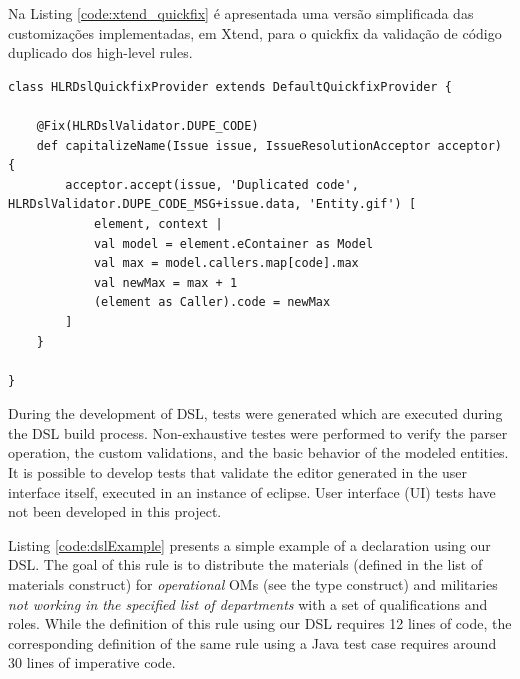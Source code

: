 Na Listing \ref{code:xtend_quickfix} é apresentada uma versão simplificada das customizações implementadas, em Xtend, para o quickfix da validação de código duplicado dos high-level rules.


\begin{small}
\begin{lstlisting}[frame=single, language=Xtend, caption={\it Quickfix Customization}, label={code:xtend_quickfix}]
class HLRDslQuickfixProvider extends DefaultQuickfixProvider {

	@Fix(HLRDslValidator.DUPE_CODE)
	def capitalizeName(Issue issue, IssueResolutionAcceptor acceptor) {
		acceptor.accept(issue, 'Duplicated code', HLRDslValidator.DUPE_CODE_MSG+issue.data, 'Entity.gif') [
			element, context |
			val model = element.eContainer as Model
			val max = model.callers.map[code].max
			val newMax = max + 1			
			(element as Caller).code = newMax
		]
	}
	
}
\end{lstlisting}
\end{small}



During the development of DSL, tests were generated which are executed during the DSL build process. Non-exhaustive testes were performed to verify the parser operation, the custom validations, and the basic behavior of the modeled entities. It is possible to develop tests that validate the editor generated in the user interface itself, executed in an instance of eclipse. User interface (UI) tests have not been developed in this project.



Listing \ref{code:dslExample} presents a simple example of a \shc declaration using our DSL. The goal of this rule is to distribute the materials (defined in the list of materials construct) for \emph{operational} OMs (see the type construct) and militaries \emph{not working in the specified list of departments} with a set of qualifications and roles. While the definition of this rule using our DSL requires 12 lines of code, the corresponding definition of the same rule using a Java test case requires around 30 lines of imperative code.

